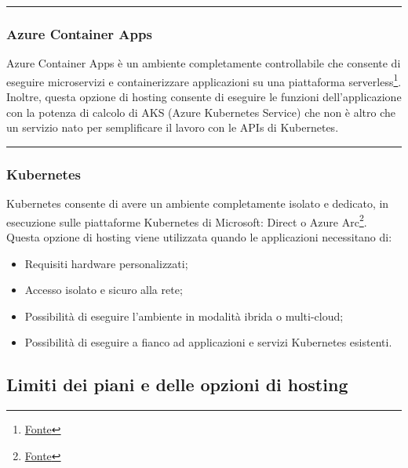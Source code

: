 \documentclass[a4paper]{article}
\newcommand{\longline}{\noindent\rule{\textwidth}{0.4pt}}
\begin{document}
	\longline
	
	\subsubsection{Azure Container Apps}
	
	Azure Container Apps è un ambiente completamente controllabile che consente di eseguire microservizi e containerizzare applicazioni su una piattaforma serverless\footnote{\href{https://learn.microsoft.com/en-gb/azure/azure-functions/functions-container-apps-hosting}{Fonte}}. Inoltre, questa opzione di hosting consente di eseguire le funzioni dell'applicazione con la potenza di calcolo di AKS (Azure Kubernetes Service) che non è altro che un servizio nato per semplificare il lavoro con le APIs di Kubernetes.
	
	\longline
	
	\subsubsection{Kubernetes}
	
	Kubernetes consente di avere un ambiente completamente isolato e dedicato, in esecuzione sulle piattaforme Kubernetes di Microsoft: Direct o Azure Arc\footnote{\href{https://learn.microsoft.com/en-gb/azure/azure-functions/functions-scale}{Fonte}}. Questa opzione di hosting viene utilizzata quando le applicazioni necessitano di:
	\begin{itemize}[label=]
		\item Requisiti hardware personalizzati;
		
		\item Accesso isolato e sicuro alla rete;
		
		\item Possibilità di eseguire l'ambiente in modalità ibrida o multi-cloud;
		
		\item Possibilità di eseguire a fianco ad applicazioni e servizi Kubernetes esistenti.
	\end{itemize}\newpage
	
	\subsection{Limiti dei piani e delle opzioni di hosting}
	
\end{document}
